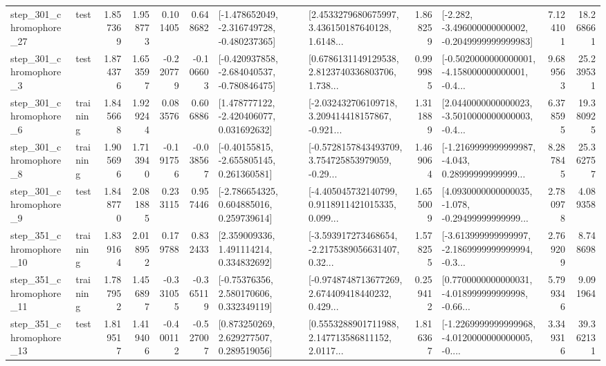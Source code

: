 \begin{tabular}{llrrrrllrlrr}
  step\_301\_chromophore\_27 &      test &      1.857369 &    1.958773 &      0.101405 &  0.648682 &  [-1.478652049, -2.316749728, -0.480237365] &  [2.4533279680675997, 3.436150187640128, 1.6148... &       1.868259 &  [-2.282, -3.496000000000002, -0.2049999999999983] &            7.124101 &         18.268661 \\
   step\_301\_chromophore\_3 &      test &      1.874376 &    1.653597 &     -0.220779 & -0.106603 &  [-0.420937858, -2.684040537, -0.780846475] &  [0.6786131149129538, 2.8123740336803706, 1.738... &       0.999985 &  [-0.5020000000000001, -4.158000000000001, -0.4... &            9.689563 &         25.239531 \\
   step\_301\_chromophore\_6 &  training &      1.845668 &    1.929244 &      0.083576 &  0.606886 &    [1.478777122, -2.420406077, 0.031692632] &  [-2.032432706109718, 3.209414418157867, -0.921... &       1.311889 &  [2.0440000000000023, -3.5010000000000003, -0.4... &            6.378595 &         19.380925 \\
   step\_301\_chromophore\_8 &  training &      1.905696 &    1.713940 &     -0.191756 & -0.038567 &    [-0.40155815, -2.655805145, 0.261360581] &  [-0.5728157843493709, 3.754725853979059, -0.29... &       1.469064 &  [-1.2169999999999987, -4.043, 0.28999999999999... &            8.287845 &         25.362757 \\
   step\_301\_chromophore\_9 &      test &      1.848770 &    2.081885 &      0.233115 &  0.957446 &    [-2.786654325, 0.604885016, 0.259739614] &  [-4.405045732140799, 0.9118911421015335, 0.099... &       1.655009 &  [4.0930000000000035, -1.078, -0.29499999999999... &            2.780978 &          4.089358 \\
  step\_351\_chromophore\_10 &  training &      1.839164 &    2.018952 &      0.179788 &  0.832433 &     [2.359009336, 1.491114214, 0.334832692] &  [-3.593917273468654, -2.2175389056631407, 0.32... &       1.578255 &  [-3.613999999999997, -2.1869999999999994, -0.3... &            2.769209 &          8.748698 \\
  step\_351\_chromophore\_11 &  training &      1.787952 &    1.456897 &     -0.331055 & -0.365119 &     [-0.75376356, 2.580170606, 0.332349119] &  [-0.9748748713677269, 2.674409418440232, 0.429... &       0.259412 &  [0.7700000000000031, -4.018999999999998, -0.66... &            5.799346 &          9.091964 \\
  step\_351\_chromophore\_13 &      test &      1.819517 &    1.419406 &     -0.400112 & -0.527007 &     [0.873250269, 2.629277507, 0.289519056] &  [0.5553288901711988, 2.147713586811152, 2.0117... &       1.816367 &  [-1.2269999999999968, -4.0120000000000005, -0.... &            3.349316 &         39.362131 \\

\end{tabular}
